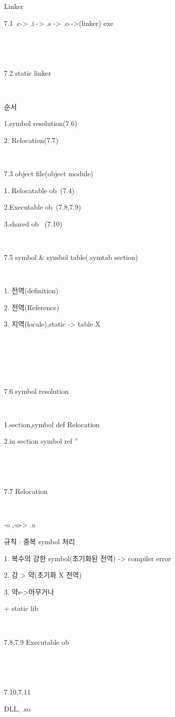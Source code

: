 Linker

7.1 .c-> .i -> .s -> .o ->(linker) exe

​

​

7.2 static linker

​

순서

1.symbol resolution(7.6)

2. Relocation(7.7)

​

7.3 object file(object module)

1. Relocatable ob~(7.4)

2.Executable ob~(7.8,7.9)

3.shared ob~ (7.10)

​

7.5 symbol & symbol table(.symtab section)

​

1. 전역(definition)

2. 전역(Reference)

3. 지역(locale),static -> table X

​

​

​

7.6 symbol resolution

​

1.section,symbol def Relocation

2.in section symbol ref ''

​

​

7.7 Relocation

​

-o ,-o-> .a

규칙 : 중복 symbol 처리

1. 복수의 강한 symbol(초기화된 전역) -> compiler error

2. 강 > 약(초기화 X 전역)

3. 약s->아무거나

+ static lib

​

7.8,7.9 Executable ob~

​

​

7.10,7.11

DLL, .so 
